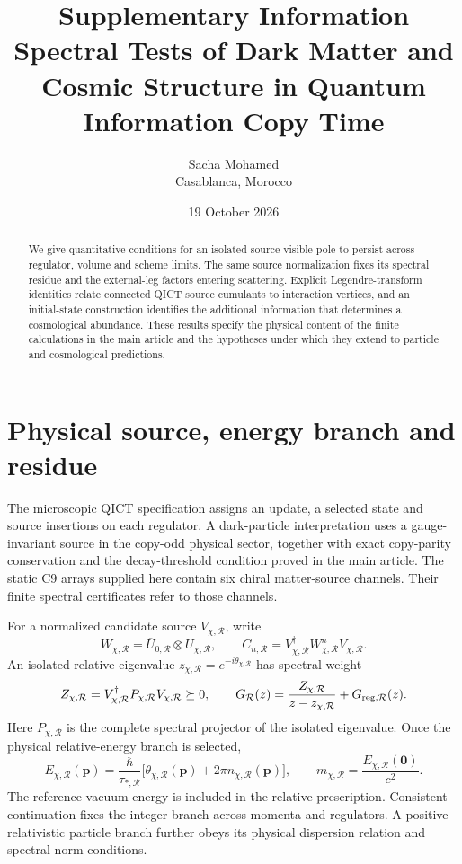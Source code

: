 \documentclass[11pt,a4paper]{article}
\title{\bfseries Supplementary Information\\[6pt]\large Spectral Tests of Dark Matter and Cosmic Structure in Quantum Information Copy Time}
\author{Sacha Mohamed\\\small Casablanca, Morocco}\date{19 October 2026}
\begin{document}
\maketitle
\begin{abstract}
We give quantitative conditions for an isolated source-visible pole to persist across regulator, volume and scheme limits. The same source normalization fixes its spectral residue and the external-leg factors entering scattering. Explicit Legendre-transform identities relate connected QICT source cumulants to interaction vertices, and an initial-state construction identifies the additional information that determines a cosmological abundance. These results specify the physical content of the finite calculations in the main article and the hypotheses under which they extend to particle and cosmological predictions.
\end{abstract}

\section{Physical source, energy branch and residue}
\label{si:source}
The microscopic QICT specification assigns an update, a selected state and source insertions on each regulator. A dark-particle interpretation uses a gauge-invariant source in the copy-odd physical sector, together with exact copy-parity conservation and the decay-threshold condition proved in the main article. The static C9 arrays supplied here contain six chiral matter-source channels. Their finite spectral certificates refer to those channels.

For a normalized candidate source $V_{\chi,\mathcal R}$, write
\begin{equation}
W_{\chi,\mathcal R}=\overline U_{0,\mathcal R}\otimes U_{\chi,\mathcal R},\qquad
C_{n,\mathcal R}=V_{\chi,\mathcal R}^{\dagger}W_{\chi,\mathcal R}^nV_{\chi,\mathcal R}.
\end{equation}
An isolated relative eigenvalue $z_{\chi,\mathcal R}=e^{-i\theta_{\chi,\mathcal R}}$ has spectral weight
\begin{equation}\label{si:eq:unitary-residue}
Z_{\chi,\mathcal R}=V_{\chi,\mathcal R}^{\dagger}P_{\chi,\mathcal R}V_{\chi,\mathcal R}\succeq0,
\qquad
G_{\mathcal R}(z)=\frac{Z_{\chi,\mathcal R}}{z-z_{\chi,\mathcal R}}+G_{{\rm reg},\mathcal R}(z).
\end{equation}
Here $P_{\chi,\mathcal R}$ is the complete spectral projector of the isolated eigenvalue. Once the physical relative-energy branch is selected,
\begin{equation}\label{si:eq:mass-map}
E_{\chi,\mathcal R}(\mathbf p)
=\frac{\hbar}{\tau_{*,\mathcal R}}\bigl[\theta_{\chi,\mathcal R}(\mathbf p)+2\pi n_{\chi,\mathcal R}(\mathbf p)\bigr],
\qquad m_{\chi,\mathcal R}=\frac{E_{\chi,\mathcal R}(\mathbf0)}{c^2}.
\end{equation}
The reference vacuum energy is included in the relative prescription. Consistent continuation fixes the integer branch across momenta and regulators. A positive relativistic particle branch further obeys its physical dispersion relation and spectral-norm conditions.
\end{document}
